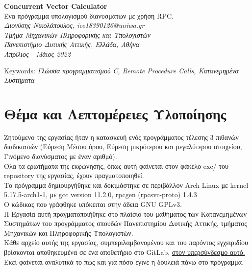 \thispagestyle{empty}
\begin{center}
    \huge{
        \textbf{
            \color{brown}Concurrent Vector Calculator\color{black}
            \vspace{5mm}
        }
    }\\
    \large{Ένα πρόγραμμα υπολογισμού διανυσμάτων με χρήση RPC.}
    \vspace{5mm}\\
    \small{\emph{
    Διονύσης Νικολόπουλος, ice18390126@uniwa.gr
    \\
    Τμήμα Μηχανικών Πληροφορικής και Υπολογιστών
    \\
    Πανεπιστήμιο Δυτικής Αττικής, Ελλάδα, Αθήνα
    \\
    Απρίλιος - Μάιος 2022
    \\
    }}
    \vspace*{5mm}
\end{center}
\footnotesize
Keywords: \emph{Γλώσσα προγραμματισμού C, Remote Procedure Calls, Κατανεμημένα
Συστήματα}
\normalsize


\section*{Θέμα και Λεπτομέρειες Υλοποίησης}
\begin{addmargin}[2em]{3em}%
\footnotesize{
    Ζητούμενο της εργασίας ήταν η κατασκευή ενός προγράμματος τέλεσης 3 πιθανών
    διαδικασιών (Εύρεση Μέσου όρου, Εύρεση μικρότερου και μεγαλύτερου στοιχείου,
    Γινόμενο διανύσματος με έναν αριθμό).
    \\
    Όλα τα ερωτήματα της εκφώνησης, όπως αυτή φαίνεται στον φάκελο exc/ του
    repository της εργασίας, έχουν πραγματοποιηθεί.
    \\
    Το πρόγραμμα δημιουργήθηκε και δοκιμάστηκε σε περιβάλλον Arch Linux
    με kernel 5.17.5-arch1-1, με gcc version 11.2.0, rpcgen (rpcsvc-proto) 1.4.3
    \\
    Ο κώδικας που γράφθηκε υπόκειται στην άδεια GNU GPLv3.
    \\
    Η Εργασία αυτή πραγματοποιήθηκε στο πλαίσιο του μαθήματος των Κατανεμημένων
    Συστημάτων του προγράμματος σπουδών Πανεπιστημίου Δυτικής Αττικής, τμήματος
    Μηχανικών και Πληροφορικής Υπολογιστών.
    \\
    \color{blue}
    Κάθε αρχείο αυτής της εργασίας, συμπεριλαμβανομένου και του παρόντος
    εγχειριδίου βρίσκονται αποθηκευμένα σε ένα αποθετήριο στο GitLab,
    \href{https://gitlab.com/nnis/concurrent-vector-calculator}
    {στον υπερσύνδεσμο αυτό.}
    \color{black}
    \\
    Εκεί φαίνεται αναλυτικά το πως και για πόσο έγινε η δουλειά πάνω
    στο πρόγραμμα.
}
\end{addmargin}
